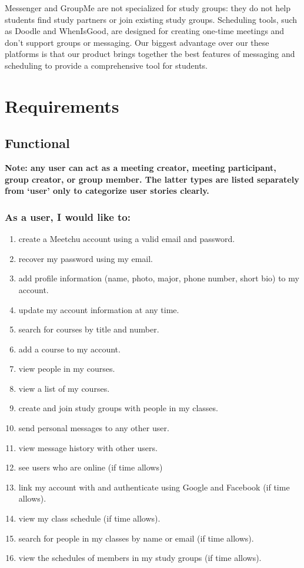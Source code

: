 \documentclass[12pt]{article}
\begin{document}
Messenger and GroupMe are not specialized for study groups: they do not help students find study partners or join existing study groups. Scheduling tools, such as Doodle and WhenIsGood, are designed for creating one-time meetings and don't support groups or messaging. Our biggest advantage over our these platforms is that our product brings together the best features of messaging and scheduling to provide a comprehensive tool for students.

\newpage

\section{Requirements}

\subsection*{Functional}

\textbf{Note: any user can act as a meeting creator, meeting participant, group creator, or group member. The latter types are listed separately from ‘user' only to categorize user stories clearly.}

\subsubsection*{As a user, I would like to:}

\begin{enumerate}[nolistsep]
    \item create a Meetchu account using a valid email and password.
    \item recover my password using my email.
    \item add profile information (name, photo, major, phone number, short bio) to my account.
    \item update my account information at any time.
    \item search for courses by title and number.
    \item add a course to my account.
    \item view people in my courses.
    \item view a list of my courses.
    \item create and join study groups with people in my classes.
    \item send personal messages to any other user.
    \item view message history with other users.
    \item see users who are online (if time allows)
    \item link my account with and authenticate using Google and Facebook (if time allows).
    \item view my class schedule (if time allows).
    \item search for people in my classes by name or email (if time allows).
    \item view the schedules of members in my study groups (if time allows).
\end{enumerate}
\end{document}
